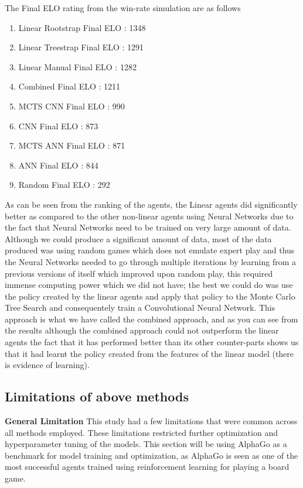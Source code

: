 \documentclass[a4paper,12pt,table]{article}
\begin{document}
The Final ELO rating from the win-rate simulation are as follows

\begin{enumerate}
    \item Linear Rootstrap Final ELO : 1348
    \item Linear Treestrap Final ELO : 1291
    \item Linear Manual Final ELO : 1282
    \item Combined Final ELO : 1211
    \item MCTS CNN Final ELO : 990
    \item CNN Final ELO : 873
    \item MCTS ANN Final ELO : 871
    \item ANN Final ELO : 844
    \item Random Final ELO : 292
\end{enumerate}

As can be seen from the ranking of the agents, the Linear agents did significantly better as compared to the other non-linear agents using Neural Networks due to the fact that Neural Networks need to be trained on very large amount of data. Although we could produce a significant amount of data, most of the data produced was using random games which does not emulate expert play and thus the Neural Networks needed to go through multiple iterations by learning from a previous versions of itself which improved upon random play, this required immense computing power which we did not have; the best we could do was use the policy created by the linear agents and apply that policy to the Monte Carlo Tree Search and consequentely train a Convolutional Neural Network. This approach is what we have called the combined approach, and as you can see from the results although the combined approach could not outperform the linear agents the fact that it has performed better than its other counter-parts shows us that it had learnt the policy created from the features of the linear model (there is evidence of learning). \par

\subsection{Limitations of above methods}

\textbf{General Limitation}
\newline
This study had a few limitations that were common across all methods employed. These limitations restricted further optimization and hyperparameter tuning of the models. This section will be using AlphaGo as a benchmark for model training and optimization, as AlphaGo is seen as one of the most successful agents trained using reinforcement learning for playing a board game. \par
\end{document}
